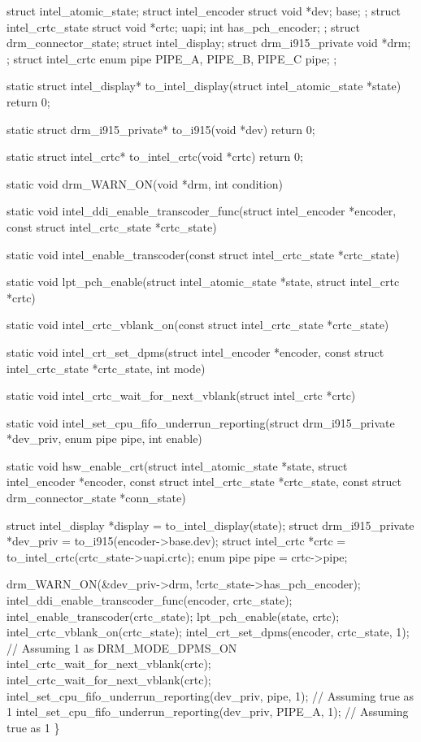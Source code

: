 \begin{lightcpp}
struct intel_atomic_state;
struct intel_encoder {
    struct {
        void *dev;
    } base;
};
struct intel_crtc_state {
    struct {
        void *crtc;
    } uapi;
    int has_pch_encoder;
};
struct drm_connector_state;
struct intel_display;
struct drm_i915_private {
    void *drm;
};
struct intel_crtc {
    enum pipe {
        PIPE_A,
        PIPE_B,
        PIPE_C
    } pipe;
};

static struct intel_display* to_intel_display(struct intel_atomic_state *state) {
    return 0;
}

static struct drm_i915_private* to_i915(void *dev) {
    return 0;
}

static struct intel_crtc* to_intel_crtc(void *crtc) {
    return 0;
}

static void drm_WARN_ON(void *drm, int condition) {}

static void intel_ddi_enable_transcoder_func(struct intel_encoder *encoder, const struct intel_crtc_state *crtc_state) {}

static void intel_enable_transcoder(const struct intel_crtc_state *crtc_state) {}

static void lpt_pch_enable(struct intel_atomic_state *state, struct intel_crtc *crtc) {}

static void intel_crtc_vblank_on(const struct intel_crtc_state *crtc_state) {}

static void intel_crt_set_dpms(struct intel_encoder *encoder, const struct intel_crtc_state *crtc_state, int mode) {}

static void intel_crtc_wait_for_next_vblank(struct intel_crtc *crtc) {}

static void intel_set_cpu_fifo_underrun_reporting(struct drm_i915_private *dev_priv, enum pipe pipe, int enable) {}

static void hsw_enable_crt(struct intel_atomic_state *state,
                           struct intel_encoder *encoder,
                           const struct intel_crtc_state *crtc_state,
                           const struct drm_connector_state *conn_state)
{
    struct intel_display *display = to_intel_display(state);
    struct drm_i915_private *dev_priv = to_i915(encoder->base.dev);
    struct intel_crtc *crtc = to_intel_crtc(crtc_state->uapi.crtc);
    enum pipe pipe = crtc->pipe;

    drm_WARN_ON(&dev_priv->drm, !crtc_state->has_pch_encoder);
    intel_ddi_enable_transcoder_func(encoder, crtc_state);
    intel_enable_transcoder(crtc_state);
    lpt_pch_enable(state, crtc);
    intel_crtc_vblank_on(crtc_state);
    intel_crt_set_dpms(encoder, crtc_state, 1); // Assuming 1 as DRM_MODE_DPMS_ON
    intel_crtc_wait_for_next_vblank(crtc);
    intel_crtc_wait_for_next_vblank(crtc);
    intel_set_cpu_fifo_underrun_reporting(dev_priv, pipe, 1); // Assuming true as 1
    intel_set_cpu_fifo_underrun_reporting(dev_priv, PIPE_A, 1); // Assuming true as 1
\}
}
\end{lightcpp}
